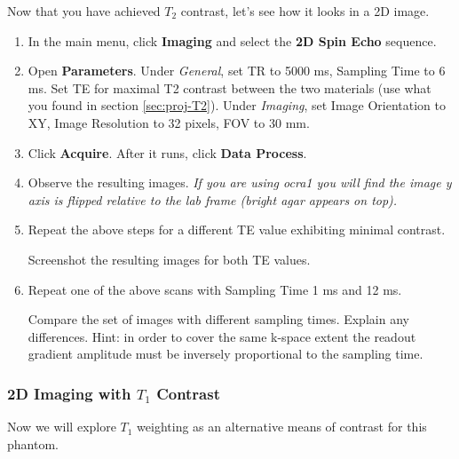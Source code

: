 Now that you have achieved $T_2$ contrast, let's see how it looks in a 2D image.

\begin{enumerate}
    \item   In the main menu, click \textbf{Imaging} and select the \textbf{2D Spin Echo} sequence.
    \item   Open \textbf{Parameters}. Under \emph{General}, set TR to 5000 ms, Sampling Time to 6 ms. Set TE for maximal T2 contrast between the two materials (use what you found in section \ref{sec:proj-T2}). Under \emph{Imaging}, set Image Orientation to XY, Image Resolution to 32 pixels, FOV to 30 mm.
    \item   Click \textbf{Acquire}. After it runs, click \textbf{Data Process}.
    \item   Observe the resulting images. \emph{If you are using ocra1 you will find the image y axis is flipped relative to the lab frame (bright agar appears on top).}
    \item   Repeat the above steps for a different TE value exhibiting minimal contrast.
    
    \color{red} Screenshot the resulting images for both TE values.
    \color{black}
 
    \item Repeat one of the above scans with Sampling Time 1 ms and 12 ms.

\color{red} \noindent
    Compare the set of images with different sampling times. Explain any differences. Hint: in order to cover the same k-space extent the readout gradient amplitude must be inversely proportional to the sampling time.
\color{black}
    
\end{enumerate}


\subsubsection{2D Imaging with $T_1$ Contrast} \label{sec:2d-T1}


Now we will explore $T_1$ weighting as an alternative means of contrast for this phantom.

